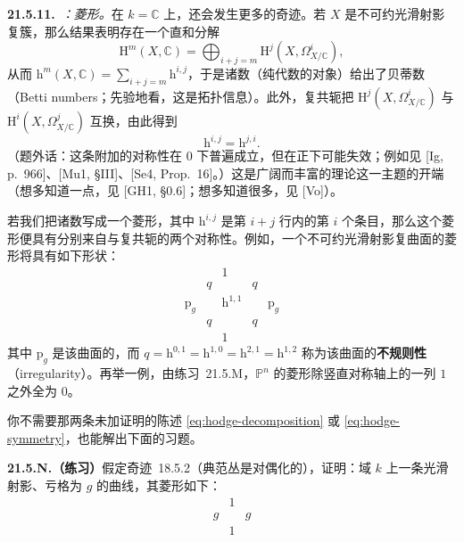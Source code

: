 \textbf{21.5.11.}\ \emph{\trhRemark{}：\trHodge{}菱形。}\quad 在 $k=\mathbb{C}$ 上，还会发生更多的奇迹。若 $X$ 是不可约光滑射影复簇，那么结果表明存在一个直和分解
\begin{equation*}\tag{21.5.11.1}\label{eq:hodge-decomposition}
\mathrm{H}^m(X,\mathbb{C})=\bigoplus_{i+j=m}\mathrm{H}^j(X,\Omega^i_{X/\mathbb{C}}),
\end{equation*}
从而 $\mathrm{h}^m(X,\mathbb{C})=\sum_{i+j=m}\mathrm{h}^{i,j}$，于是诸\trHodge{}数（纯代数的对象）给出了贝蒂数（Betti numbers；先验地看，这是拓扑信息）。此外，复共轭把 $\mathrm{H}^j(X,\Omega^i_{X/\mathbb{C}})$ 与 $\mathrm{H}^i(X,\Omega^j_{X/\mathbb{C}})$ 互换，由此得到
\begin{equation*}\tag{21.5.11.2}\label{eq:hodge-symmetry}
\mathrm{h}^{i,j}=\mathrm{h}^{j,i}.
\end{equation*}
（题外话：这条附加的对称性在\trCharacteristic{} $0$ 下普遍成立，但在正\trCharacteristic{}下可能失效；例如见 [Ig, p.~966]、[Mu1, \S III]、[Se4, Prop.~16]。）这是广阔而丰富的\trHodge{}理论这一主题的开端（想多知道一点，见 [GH1, \S0.6]；想多知道很多，见 [Vo]）。

若我们把诸\trHodge{}数写成一个菱形，其中 $\mathrm{h}^{i,j}$ 是第 $i+j$ 行内的第 $i$ 个条目，那么这个菱形便具有分别来自\trSerreDuality{}与复共轭的两个对称性。例如，一个不可约光滑射影复曲面的\trHodge{}菱形将具有如下形状：
\[
\begin{array}{ccccc}
 & & 1 & & \\
 & q & & q & \\
 \mathrm{p}_g & & \mathrm{h}^{1,1} & & \mathrm{p}_g \\
 & q & & q & \\
 & & 1 & &
\end{array}
\]
其中 $\mathrm{p}_g$ 是该曲面的\trGeometricGenus，而 $q=\mathrm{h}^{0,1}=\mathrm{h}^{1,0}=\mathrm{h}^{2,1}=\mathrm{h}^{1,2}$ 称为该曲面的\textbf{不规则性}（irregularity）。再举一例，由\mbox{练习~21.5.M}，$\mathbb{P}^n$ 的\trHodge{}菱形除竖直对称轴上的一列 $1$ 之外全为 $0$。

你不需要那两条未加证明的陈述 \eqref{eq:hodge-decomposition} 或 \eqref{eq:hodge-symmetry}，也能解出下面的习题。

\textbf{21.5.N.（练习）}\quad 假定\mbox{奇迹~18.5.2}（典范丛是\trSerre{}对偶化的），证明：域 $k$ 上一条光滑射影\trGeometricallyIrreducible{}、亏格为 $g$ 的曲线，其\trHodge{}菱形如下：
\[
\begin{array}{ccc}
 & 1 & \\
 g & & g \\
 & 1 &
\end{array}
\]

